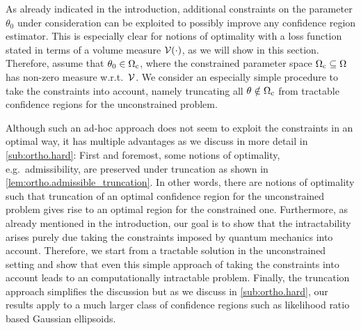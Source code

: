 As already indicated in the introduction, additional constraints on the parameter $\theta_0$ under consideration can be exploited to possibly improve any confidence region estimator.
This is especially clear for notions of optimality with a loss function stated in terms of a volume measure $\mathcal{V}(\cdot)$, as we will show in this section.
Therefore, assume that $\theta_0 \in \Omega_{\mathrm{c}}$, where the constrained parameter space $\Omega_{\mathrm{c}} \subseteq \Omega$ has non-zero measure w.r.t.\ $\mathcal{V}$.
We consider an especially simple procedure to take the constraints into account, namely truncating all $\theta \notin \Omega_{\mathrm{c}}$ from tractable confidence regions for the unconstrained problem.

Although such an ad-hoc approach does not seem to exploit the constraints in an optimal way, it has multiple advantages as we discuss in more detail in \cref{sub:ortho.hard}:
First and foremost, some notions of optimality, e.g.\ admissibility, are preserved under truncation as shown in \cref{lem:ortho.admissible_truncation}.
In other words, there are notions of optimality such that truncation of an optimal confidence region for the unconstrained problem gives rise to an optimal region for the constrained one.
Furthermore, as already mentioned in the introduction, our goal is to show that the intractability arises purely due taking the constraints imposed by quantum mechanics into account.
Therefore, we start from a tractable solution in the unconstrained setting and show that even this simple approach of taking the constraints into account leads to an computationally intractable problem.
Finally, the truncation approach simplifies the discussion but as we discuss in \cref{sub:ortho.hard}, our results apply to a much larger class of confidence regions such as likelihood ratio based Gaussian ellipsoids.\\


